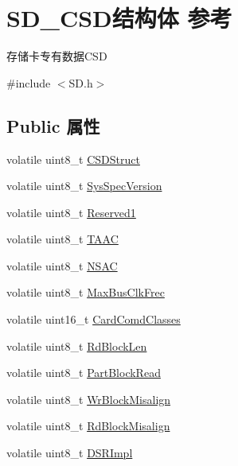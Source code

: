 \hypertarget{struct_s_d___c_s_d}{}\section{S\+D\+\_\+\+C\+S\+D结构体 参考}
\label{struct_s_d___c_s_d}


存储卡专有数据\+C\+SD  




{\ttfamily \#include $<$S\+D.\+h$>$}

\subsection*{Public 属性}
\begin{DoxyCompactItemize}
\item 
volatile uint8\+\_\+t \hyperlink{group__sd__card_ga700c48bc2c031e2b002dd551a1af154c}{C\+S\+D\+Struct}
\item 
volatile uint8\+\_\+t \hyperlink{group__sd__card_gae42076ec74babfee72c7a3705d13461a}{Sys\+Spec\+Version}
\item 
volatile uint8\+\_\+t \hyperlink{group__sd__card_gab7c521a48dcc810a5b1b76278d5bebb2}{Reserved1}
\item 
volatile uint8\+\_\+t \hyperlink{group__sd__card_gac3a3b789a57530a170119a3459571632}{T\+A\+AC}
\item 
volatile uint8\+\_\+t \hyperlink{group__sd__card_gaf243b37ec081b6ef479a3d2d50668543}{N\+S\+AC}
\item 
volatile uint8\+\_\+t \hyperlink{group__sd__card_gab044e6cb2434800c2dd10fbd71519a64}{Max\+Bus\+Clk\+Frec}
\item 
volatile uint16\+\_\+t \hyperlink{group__sd__card_ga2777d2837a2db0a106ce0a915253f24d}{Card\+Comd\+Classes}
\item 
volatile uint8\+\_\+t \hyperlink{group__sd__card_ga03458802593a7d3eeffa8518b204ba73}{Rd\+Block\+Len}
\item 
volatile uint8\+\_\+t \hyperlink{group__sd__card_gad1480fb0cce305cbec05307b277fe9e6}{Part\+Block\+Read}
\item 
volatile uint8\+\_\+t \hyperlink{group__sd__card_gac92bbdc65323bdaa2738ba34fb801694}{Wr\+Block\+Misalign}
\item 
volatile uint8\+\_\+t \hyperlink{group__sd__card_ga897fc62e6505259c20ac4490a589a09c}{Rd\+Block\+Misalign}
\item 
volatile uint8\+\_\+t \hyperlink{group__sd__card_ga96e5ee8c184999bd5f2b007015e2a7a9}{D\+S\+R\+Impl}
\item 

\end{DoxyCompactItemize}
